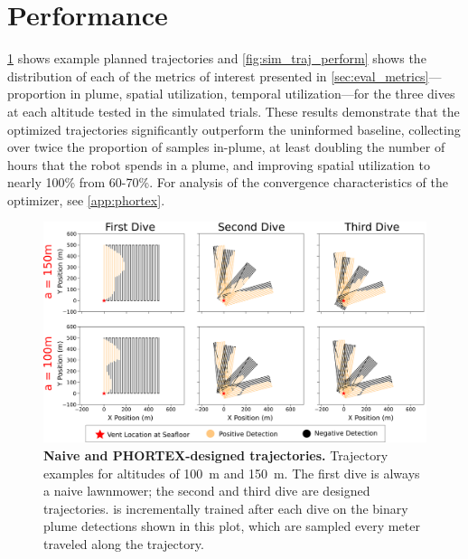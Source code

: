 \section{\PHORTEX Performance}
\label{sec:phortex_perform}
\cref{fig:sim_traj_example} shows example planned trajectories and \cref{fig:sim_traj_perform} shows the distribution of each of the metrics of interest presented in \cref{sec:eval_metrics}---proportion in plume, spatial utilization, temporal utilization---for the three dives at each altitude tested in the simulated trials. These results demonstrate that the \PHORTEX optimized trajectories significantly outperform the uninformed baseline, collecting over twice the proportion of samples in-plume, at least doubling the number of hours that the robot spends in a plume, and improving spatial utilization to nearly 100\% from 60-70\%. For analysis of the convergence characteristics of the optimizer, see \cref{app:phortex}. 

\begin{figure}
    \centering
    \includegraphics[width=1\columnwidth]{figures/sim_traj.png}
    \caption[Naive and \PHORTEX-design trajectories.]{\textbf{Naive and PHORTEX-designed trajectories.} Trajectory examples for altitudes of \SI{100}{\meter} and \SI{150}{\meter}. The first dive is always a naive lawnmower; the second and third dive are \PHORTEX designed trajectories. \PHUMES is incrementally trained after each dive on the binary plume detections shown in this plot, which are sampled every meter traveled along the trajectory.}
    \label{fig:sim_traj_example}
\end{figure}

